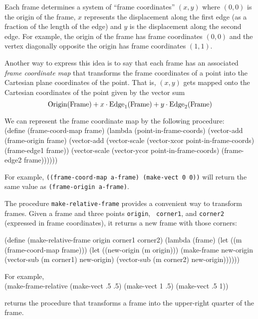 \documentclass[11pt]{article}
\begin{document}
Each frame determines a system of ``frame coordinates'' $(x,y)$ where
$(0,0)$ is the origin of the frame, $x$ represents the displacement 
along the first edge (as a fraction of the length of the edge) and $y$ is the
displacement along the second edge.  For example, the origin of the
frame has frame coordinates $(0,0)$ and the vertex diagonally opposite
the origin has frame coordinates $(1,1)$.

Another way to express this idea is to say that each frame has an
associated {\em frame coordinate map} that transforms the frame
coordinates of a point into the Cartesian plane coordinates of the
point.  That is, $(x,y)$ gets mapped onto the Cartesian
coordinates of the point given by the vector sum
\begin{displaymath}
\hbox{\rm Origin(Frame)} + x\cdot \hbox{\rm Edge}_1\hbox{\rm (Frame)}
+ y\cdot \hbox{\rm Edge}_2\hbox{\rm (Frame)} 
\end{displaymath}

We can represent the frame coordinate map by the following procedure:\\
\beginlisp
(define (frame-coord-map frame)
  (lambda (point-in-frame-coords)
    (vector-add
     (frame-origin frame)
     (vector-add (vector-scale (vector-xcor point-in-frame-coords)
                               (frame-edge1 frame))
                 (vector-scale (vector-ycor point-in-frame-coords)
                               (frame-edge2 frame))))))
\endlisp

For example, {\tt ((frame-coord-map a-frame) (make-vect 0 0))} will
return the same value as {\tt (frame-origin a-frame)}.

The procedure {\tt make-relative-frame} provides a convenient way to
transform frames.  Given a frame and three points {\tt origin}, {\tt
corner1}, and {\tt corner2} (expressed in frame coordinates), it
returns a new frame with those corners:

\beginlisp
(define (make-relative-frame origin corner1 corner2)
  (lambda (frame)
    (let ((m (frame-coord-map frame)))
      (let ((new-origin (m origin)))
        (make-frame new-origin
                    (vector-sub (m corner1) new-origin)
                    (vector-sub (m corner2) new-origin))))))
\endlisp

\noindent
For example,\\
\beginlisp
(make-frame-relative (make-vect .5 .5) (make-vect 1 .5) (make-vect .5 1))
\endlisp

\noindent
returns the procedure that transforms a frame into the upper-right
quarter of the frame.
\end{document}
